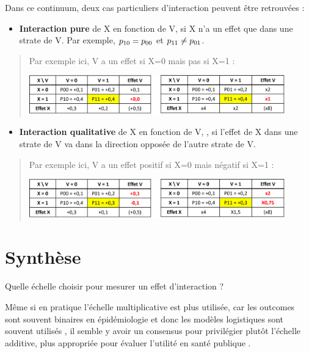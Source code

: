 \documentclass[
]{book}
\providecommand{\tightlist}{%
  \setlength{\itemsep}{0pt}\setlength{\parskip}{0pt}}
\begin{document}
Dans ce continuum, deux cas particuliers d'interaction peuvent être retrouvées :

\begin{itemize}
\tightlist
\item
  \textbf{Interaction pure} de X en fonction de V, si X n'a un effet que dans une strate de V. Par exemple, \(\small p_{10} = p_{00}\) et \(\small p_{11} \neq p_{01}\).
\end{itemize}

\begin{quote}
Par exemple ici, V a un effet si X=0 mais pas si X=1 :

\includegraphics[width=0.9\textwidth,height=\textheight]{img/Image8.png}
\end{quote}

\begin{itemize}
\tightlist
\item
  \textbf{Interaction qualitative} de X en fonction de V, , si l'effet de X dans une strate de V va dans la direction opposée de l'autre strate de V.
\end{itemize}

\begin{quote}
Par exemple ici, V a un effet positif si X=0 mais négatif si X=1 :

\includegraphics[width=0.9\textwidth,height=\textheight]{img/Image9.png}
\end{quote}

\hypertarget{synthuxe8se-1}{%
\section{Synthèse}\label{synthuxe8se-1}}

Quelle échelle choisir pour mesurer un effet d'interaction ?

Même si en pratique l'échelle multiplicative est plus utilisée, car les outcomes sont souvent binaires en épidémiologie et donc les modèles logistiques sont souvent utilisés \citet{knol_recommendations_2012}, il semble y avoir un consensus pour privilégier plutôt l'échelle additive, plus appropriée pour évaluer l'utilité en santé publique \citet{vanderweele_tutorial_2014} \citet{knol_recommendations_2012}.
\end{document}
